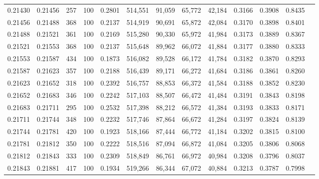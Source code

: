 \begin{tabular}{rrrrrrrrrrrrr}
0.21430 & 0.21456 &   257 & 100 &                                     0.2801 & 514,551 &  91,059 &  65,772 &  42,184 & 0.3166 & 0.3908 & 0.8435 \\
0.21456 & 0.21488 &   368 & 100 &                                     0.2137 & 514,919 &  90,691 &  65,872 &  42,084 & 0.3170 & 0.3898 & 0.8401 \\
0.21488 & 0.21521 &   361 & 100 &                                     0.2169 & 515,280 &  90,330 &  65,972 &  41,984 & 0.3173 & 0.3889 & 0.8367 \\
0.21521 & 0.21553 &   368 & 100 &                                     0.2137 & 515,648 &  89,962 &  66,072 &  41,884 & 0.3177 & 0.3880 & 0.8333 \\
0.21553 & 0.21587 &   434 & 100 &                                     0.1873 & 516,082 &  89,528 &  66,172 &  41,784 & 0.3182 & 0.3870 & 0.8293 \\
0.21587 & 0.21623 &   357 & 100 &                                     0.2188 & 516,439 &  89,171 &  66,272 &  41,684 & 0.3186 & 0.3861 & 0.8260 \\
0.21623 & 0.21652 &   318 & 100 &                                     0.2392 & 516,757 &  88,853 &  66,372 &  41,584 & 0.3188 & 0.3852 & 0.8230 \\
0.21652 & 0.21683 &   346 & 100 &                                     0.2242 & 517,103 &  88,507 &  66,472 &  41,484 & 0.3191 & 0.3843 & 0.8198 \\
0.21683 & 0.21711 &   295 & 100 &                                     0.2532 & 517,398 &  88,212 &  66,572 &  41,384 & 0.3193 & 0.3833 & 0.8171 \\
0.21711 & 0.21744 &   348 & 100 &                                     0.2232 & 517,746 &  87,864 &  66,672 &  41,284 & 0.3197 & 0.3824 & 0.8139 \\
0.21744 & 0.21781 &   420 & 100 &                                     0.1923 & 518,166 &  87,444 &  66,772 &  41,184 & 0.3202 & 0.3815 & 0.8100 \\
0.21781 & 0.21812 &   350 & 100 &                                     0.2222 & 518,516 &  87,094 &  66,872 &  41,084 & 0.3205 & 0.3806 & 0.8068 \\
0.21812 & 0.21843 &   333 & 100 &                                     0.2309 & 518,849 &  86,761 &  66,972 &  40,984 & 0.3208 & 0.3796 & 0.8037 \\
0.21843 & 0.21881 &   417 & 100 &                                     0.1934 & 519,266 &  86,344 &  67,072 &  40,884 & 0.3213 & 0.3787 & 0.7998 \\

\end{tabular}
